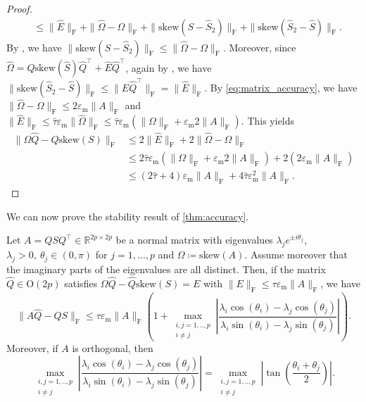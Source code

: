 \documentclass[10pt,twoside,dvipsnames]{siamart1116}
\numberwithin{algorithm}{section}
\numberwithin{equation}{section}
\begin{document}
{\begin{proof}
\begin{align*}
	&\leq \|\widehat{E}\|_\mathrm{F} + \|\widehat{\Omega}-\Omega\|_\mathrm{F}+\|\mathrm{skew}(S-\widehat{S}_2)\|_\mathrm{F} + \|\mathrm{skew}(\widehat{S}_2-\widehat{S})\|_\mathrm{F}.
\end{align*}
By \cite[Thm.~1]{HoffmanWielandt}, we have $\|\mathrm{skew}(S-\widehat{S}_2)\|_\mathrm{F}\leq \|\widehat{\Omega}-\Omega\|_\mathrm{F}$. Moreover, since $\widehat{\Omega} = \widehat{Q}\mathrm{skew}(\widehat{S})\widehat{Q}^\top  + \widehat{E}\widehat{Q}^\top$, again by \cite[Thm.~1]{HoffmanWielandt}, we have $\|\mathrm{skew}(\widehat{S}_2-\widehat{S})\|_\mathrm{F}\leq\| \widehat{E}\widehat{Q}^\top\|_\mathrm{F} = \| \widehat{E}\|_\mathrm{F}$. By \eqref{eq:matrix_accuracy}, we have $\|\widehat{\Omega}-\Omega\|_\mathrm{F}\leq 2\varepsilon_\mathrm{m}\|A\|_\mathrm{F}$ and $\| \widehat{E}\|_\mathrm{F}\leq \widehat{\tau} \varepsilon_\mathrm{m}\|\widehat{\Omega}\|_\mathrm{F} \leq \widehat{\tau} \varepsilon_\mathrm{m}(\|\Omega\|_\mathrm{F} + \varepsilon_\mathrm{m}2\|A\|_\mathrm{F})$. This yields
\begin{align*}
	\|\Omega \widehat{Q} -\widehat{Q}\mathrm{skew}(S)\|_\mathrm{F}&\leq 2\|\widehat{E}\|_\mathrm{F} + 2\|\widehat{\Omega}-\Omega\|_\mathrm{F}\\
	&\leq 2\widehat{\tau} \varepsilon_\mathrm{m} (\|\Omega\|_\mathrm{F}+\varepsilon_\mathrm{m} 2\|A\|_\mathrm{F}) + 2(2\varepsilon_\mathrm{m} \|A\|_\mathrm{F})\\
	&\leq (2\widehat{\tau} +4) \varepsilon_\mathrm{m} \|A\|_\mathrm{F}+4\widehat{\tau} \varepsilon_\mathrm{m}^2  \|A\|_\mathrm{F}.
\end{align*}
\end{proof}}
We can now prove the stability result of \cref{thm:accuracy}.
\begin{theorem}\label{thm:accuracy}
Let $A=QSQ^\top \in\mathbb{R}^{2p\times 2p}$ be a normal matrix with eigenvalues $\lambda_j e^{\pm i\theta_j}$, $\lambda_j>0,\ \theta_j\in(0,\pi)$ for $j=1,...,p$ and $\Omega \coloneq \mathrm{skew}(A)$. Assume moreover that the imaginary parts of the eigenvalues are all distinct. Then, if the matrix $\widehat{Q}\in\mathrm{O}(2p)$ satisfies $\Omega\widehat{Q}-\widehat{Q}\mathrm{skew}(S)= E$ with $\|E\|_\mathrm{F}\leq \tau \varepsilon_\mathrm{m} \|A\|_\mathrm{F}$, we have
\begin{equation}\label{eq:final_result}
	\|A\widehat{Q}-\widehat{Q}S\|_\mathrm{F}\leq \tau \varepsilon_\mathrm{m}\|A\|_\mathrm{F} \left(1+\max_{\substack{i,j=1,..,p \\ i\neq j}}\left|\frac{\lambda_i\cos(\theta_i)-\lambda_j \cos(\theta_j)}{\lambda_i \sin(\theta_i)-\lambda_j \sin(\theta_j)}\right|\right).
\end{equation}
Moreover, if $A$ is orthogonal, then 
\begin{equation}\label{eq:tangent}
\max_{\substack{i,j=1,..,p \\ i\neq j}}\left|\frac{\lambda_i\cos(\theta_i)-\lambda_j \cos(\theta_j)}{\lambda_i \sin(\theta_i)-\lambda_j \sin(\theta_j)}\right|=\max_{\substack{i,j=1,..,p \\ i\neq j}}\left|\tan\left(\frac{\theta_i+\theta_j}{2}\right)\right|.
\end{equation}
\end{theorem}
\end{document}
